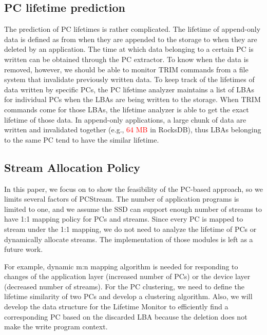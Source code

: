 \vspace{-5pt}
\subsection{PC lifetime prediction}

The prediction of PC lifetimes is rather complicated. The lifetime of
append-only data is defined as from when they are appended to the storage to
when they are deleted by an application. The time at which data belonging to a
certain PC is written can be obtained through the PC extractor. To know when
the data is removed, however, we should be able to monitor TRIM commands from a
file system that invalidate previously written data.  To keep track of the
lifetimes of data written by specific PCs, the PC lifetime analyzer maintains a
list of LBAs for individual PCs when the LBAs are being written to the storage.
When TRIM commands come for those LBAs, the lifetime analyzer is able to get
the exact lifetime of those data. In append-only applications, a large chunk of
data are written and invalidated together (e.g., \textcolor{red}{64 MB} in
RocksDB), thus LBAs belonging to the same PC tend to have the similar lifetime.



\vspace{-5pt}
\subsection{Stream Allocation Policy}
In this paper, we focus on to show the feasibility of the PC-based approach, 
so we limits several factors of PCStream.
The number of application programs is limited to one, 
and we assume the SSD can support enough number of streams
to have 1:1 mapping policy for PCs and streams.
Since every PC is mapped to stream under the 1:1 mapping, 
we do not need to analyze the lifetime of PCs 
or dynamically allocate streams.
The implementation of those modules 
is left as a future work. 

For example, dynamic m:n mapping algorithm is
needed for responding to changes of
the application layer (increased number of PCs)
or the device layer (decreased number of streams).
For the PC clustering, we need to define the lifetime similarity of two PCs
and develop a clustering algorithm.
Also, we will develop the data structure
for the Lifetime Monitor to efficiently find a corresponding PC 
based on the discarded LBA because the deletion does not
make the write program context.

